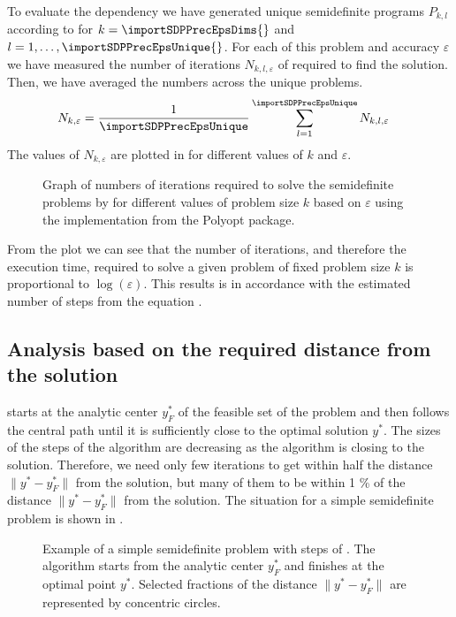 To evaluate the dependency we have generated unique semidefinite programs $P_{k, l}$ according to  for $k = \importSDPPrecEpsDims{}$ and $l = 1,\ldots,\importSDPPrecEpsUnique{}$.
For each of this problem and accuracy $\varepsilon$ we have measured the number of iterations $N_{k,l,\varepsilon}$ of  required to find the solution.
Then, we have averaged the numbers across the unique problems.
\begin{align}
  N_{k,\varepsilon} &= \frac{1}{\importSDPPrecEpsUnique}\sum_{l=1}^{\importSDPPrecEpsUnique}N_{k,l,\varepsilon}
\end{align}
The values of $N_{k,\varepsilon}$ are plotted in  for different values of $k$ and $\varepsilon$.

\begin{figure}[ht]
  \centering
  \resizebox{0.95\textwidth}{!}{}
  \caption{Graph of numbers of iterations required to solve the semidefinite problems by  for different values of problem size $k$ based on $\varepsilon$ using the implementation from the Polyopt package.}
\end{figure}

From the plot we can see that the number of iterations, and therefore the execution time, required to solve a given problem of fixed problem size $k$ is proportional to $\log(\varepsilon)$.
This results is in accordance with the estimated number of steps from the equation .

\subsection{Analysis based on the required distance from the solution}

 starts at the analytic center $y_F^*$ of the feasible set of the problem and then follows the central path until it is sufficiently close to the optimal solution $y^*$.
The sizes of the steps of the algorithm are decreasing as the algorithm is closing to the solution.
Therefore, we need only few iterations to get within half the distance $\|y^* - y_F^*\|$ from the solution, but many of them to be within 1 \% of the distance $\|y^* - y_F^*\|$ from the solution.
The situation for a simple semidefinite problem is shown in .

\begin{figure}[ht]
  \centering
  \resizebox{0.95\textwidth}{!}{}
  \caption{Example of a simple semidefinite problem with steps of . The algorithm starts from the analytic center $y^*_{F}$ and finishes at the optimal point $y^*$. Selected fractions of the distance $\|y^* - y_F^*\|$ are represented by concentric circles.}
\end{figure}

